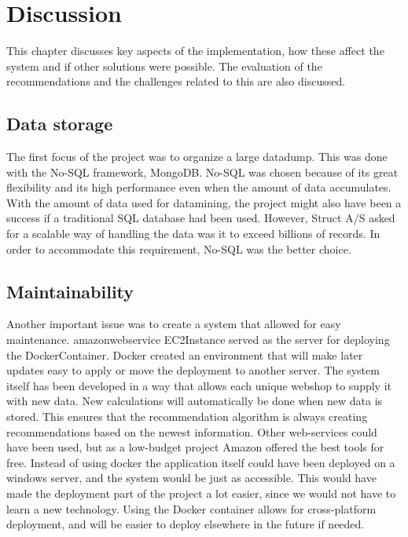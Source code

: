 
\chapter{Discussion} %

\label{Chapter7} %

This chapter discusses key aspects of the implementation, how these affect the system and if other solutions were possible. The evaluation of the recommendations and the challenges related to this are also discussed.

\section{Data storage}
The first focus of the project was to organize a large datadump. This was done with the No-SQL framework, MongoDB. No-SQL was chosen because of its great flexibility and its high performance even when the amount of data accumulates. With the amount of data used for datamining, the project might also have been a success if a traditional SQL database had been used. However, Struct A/S asked for a scalable way of handling the data was it to exceed billions of records. In order to accommodate this requirement, No-SQL was the better choice.

\section{Maintainability}
Another important issue was to create a system that allowed for easy maintenance. \gls{amazonwebservice} \gls{EC2Instance} served as the server for deploying the \gls{DockerContainer}. Docker created an environment that will make later updates easy to apply or move the deployment to another server. The system itself has been developed in a way that allows each unique webshop to supply it with new data. New calculations will automatically be done when new data is stored. This ensures that the recommendation algorithm is always creating recommendations based on the newest information. Other web-services could have been used, but as a low-budget project Amazon offered the best tools for free.
Instead of using docker the application itself could have been deployed on a windows server, and the system would be just as accessible. This would have made the deployment part of the project a lot easier, since we would not have to learn a new technology. Using the Docker container allows for cross-platform deployment, and will be easier to deploy elsewhere in the future if needed.

